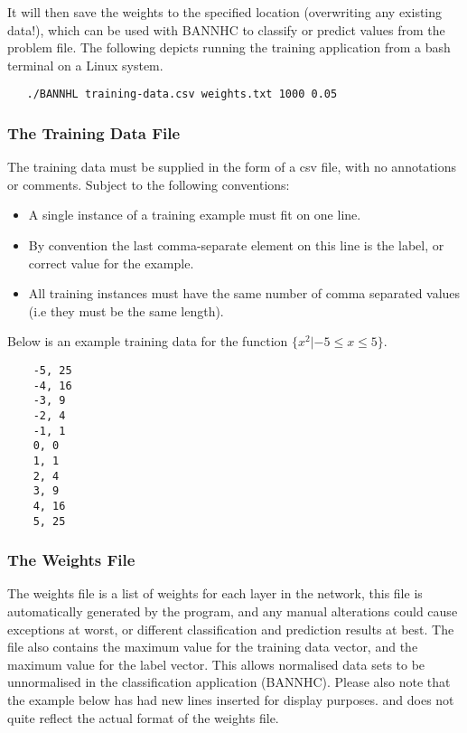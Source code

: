 \documentclass[a4paper]{article}
\newenvironment{code}{\captionsetup{type=listing}}{}
\begin{document}
It will then save the weights to the specified location (overwriting any
existing data!), which can be used with BANNHC to classify or predict values
from the problem file. The following depicts running the training application
from a bash terminal on a Linux system. 
\begin{code}
   \begin{verbatim}
   ./BANNHL training-data.csv weights.txt 1000 0.05
   \end{verbatim}
\end{code}

\subsubsection{The Training Data File}
The training data must be supplied in the form of a csv file, with no
annotations or comments. Subject to the following conventions:

\begin{itemize}
   \item A single instance of a training example must fit on one line.
   \item By convention the last comma-separate element on this line is
   the label, or correct value for the example.
   \item All training instances must have the same number of comma separated
   values (i.e they must be the same length).
\end{itemize}

Below is an example training data for the function 
$\{x^2 | {-5} \leq x \leq 5\}$. \\
\begin{code}
    \begin{verbatim}
    -5, 25
    -4, 16
    -3, 9
    -2, 4
    -1, 1
    0, 0
    1, 1
    2, 4
    3, 9
    4, 16
    5, 25
    \end{verbatim}
\end{code}

\subsubsection{The Weights File}
The weights file is a list of weights for each layer in the network, this
file is automatically generated by the program, and any manual alterations
could cause exceptions at worst, or different classification and prediction
results at best.
The file also contains the maximum value for the training data vector, and the
maximum value for the label vector. This allows normalised data sets to be
unnormalised in the classification application (BANNHC). 
Please also note that the example below has had new lines inserted for display 
purposes. and does not quite reflect the actual format of the weights file.
\end{document}
